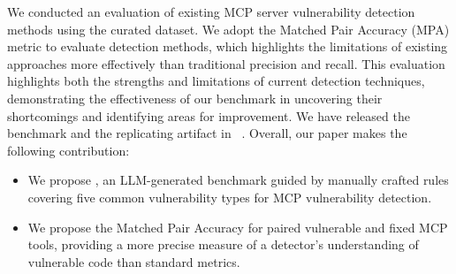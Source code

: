 We conducted an evaluation of existing MCP server vulnerability detection methods using the curated dataset. We adopt the Matched Pair Accuracy (MPA) metric to evaluate detection methods, which highlights the limitations of existing approaches more effectively than traditional precision and recall. This evaluation highlights both the strengths and limitations of current detection techniques, demonstrating the effectiveness of our benchmark in uncovering their shortcomings and identifying areas for improvement. We have released the benchmark and the replicating artifact in ~\cite{artifact}. Overall, our paper makes the following contribution:

\begin{itemize}[leftmargin=*]
    \item We propose \bench, an LLM-generated benchmark guided by manually crafted rules covering five common vulnerability types for MCP vulnerability detection.
    \item We propose the Matched Pair Accuracy for paired vulnerable and fixed MCP tools, providing a more precise measure of a detector’s understanding of vulnerable code than standard metrics.
\end{itemize}







